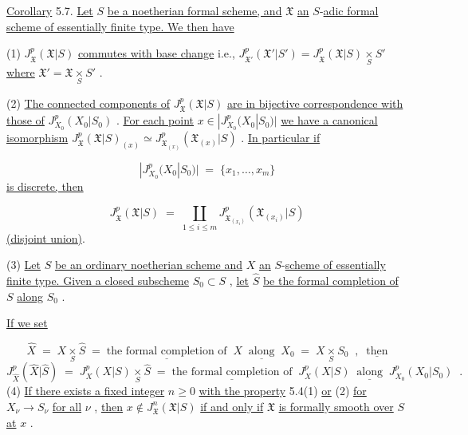 \underline{Corollary} 5.7. \underline{Let} $S$ \underline{be a noetherian formal scheme, and} $\mathfrak{X}$ \underline{an} $S$-\underline{adic formal scheme of essentially finite type. We then have}

(1) $J^p_{\mathfrak{X}}(\mathfrak{X}|S)$ \underline{commutes with base change} i.e., $J^p_{\mathfrak{X}'}(\mathfrak{X}'|S') = J^p_{\mathfrak{X}}(\mathfrak{X}|S) \underset{S}{\times} S'$ \underline{where} $\mathfrak{X}' = \mathfrak{X} \underset{S}{\times} S'$ .

(2) \underline{The connected components of} $J^p_{\mathfrak{X}}(\mathfrak{X}|S)$ \underline{are in bijective correspondence with those of} $J^p_{X_0}(X_0|S_0)$ . \underline{For each point} $x \in |J^p_{X_0}(X_0|S_0)|$ \underline{we have a canonical isomorphism} $J^p_{\mathfrak{X}}(\mathfrak{X}|S)_{(x)} \simeq J^p_{\mathfrak{X}_{(x)}}(\mathfrak{X}_{(x)}|S)$ . \underline{In particular if}

\begin{equation*}
|J^p_{X_0}(X_0|S_0)| \;=\; \{x_1,\dots,x_m\}
\end{equation*}
\underline{is discrete, then}

\begin{equation*}
J^p_{\mathfrak{X}}(\mathfrak{X}|S) \;=\; \coprod_{1 \leq i \leq m} J^p_{\mathfrak{X}_{(x_i)}}(\mathfrak{X}_{(x_i)}|S)
\end{equation*}
\underline{(disjoint union)}.



(3) \underline{Let} $S$ \underline{be an ordinary noetherian scheme and} $X$ \underline{an} $S$-\underline{scheme of essentially finite type. Given a closed subscheme} $S_0 \subset S$ , \underline{let} $\widehat{S}$ \underline{be the formal completion of} $S$ \underline{along} $S_0$ .

\underline{If we set}

\begin{equation*}
\widehat{X} \;=\; X \underset{S}{\times} \widehat{S} \;=\; \underline{\text{the formal completion of}}\;\; X \;\; \underline{\text{along}} \;\; X_0 \;=\; X \underset{S}{\times} S_0 \;\;,\;\; \underline{\text{then}}
\end{equation*}
\begin{equation*}
J^{p}_{\widehat{X}}(\widehat{X}|\widehat{S}) \;=\; J^{p}_{X}(X|S) \underset{S}{\times} \widehat{S} \;=\; \underline{\text{the formal completion of}} \;\; J^{p}_{X}(X|S) \;\; \underline{\text{along}} \;\; J^{p}_{X_0}(X_0|S_0) \;\;.
\end{equation*}
(4) \underline{If there exists a fixed integer} $n \geq 0$ \underline{with the property} 5.4(1) \underline{or} (2) \underline{for} $X_\nu \to S_\nu$ \underline{for all} $\nu$ , \underline{then} $x \notin J^{n}_{\mathfrak{X}}(\mathfrak{X}|S)$ \underline{if and only if} $\mathfrak{X}$ \underline{is formally smooth over} $S$ \underline{at} $x$ .

